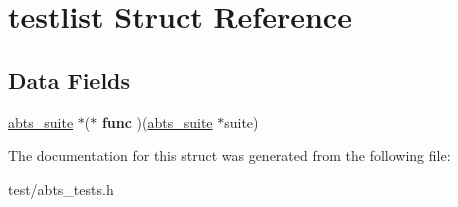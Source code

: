 \hypertarget{structtestlist}{\section{testlist Struct Reference}
\label{structtestlist}
}
\subsection*{Data Fields}
\begin{DoxyCompactItemize}
\item 
\hypertarget{structtestlist_a8ec4d82866ff5f4608846e0ace3673c2}{\hyperlink{structabts__suite}{abts\-\_\-suite} $\ast$($\ast$ {\bfseries func} )(\hyperlink{structabts__suite}{abts\-\_\-suite} $\ast$suite)}\label{structtestlist_a8ec4d82866ff5f4608846e0ace3673c2}

\end{DoxyCompactItemize}


The documentation for this struct was generated from the following file\-:\begin{DoxyCompactItemize}
\item 
test/abts\-\_\-tests.\-h\end{DoxyCompactItemize}
